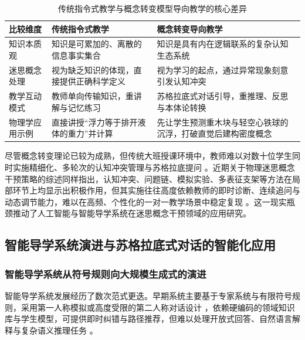 \begin{table}[htbp]
\caption{传统指令式教学与概念转变模型导向教学的核心差异}
\label{tab:1}
\begin{tabularx}{\textwidth}{|X|X|X|}
\hline
比较维度 & 传统指令式教学 & 概念转变导向教学 \\
\hline
知识本质观 & 知识是可累加的、离散的信息事实集合 & 知识是具有内在逻辑联系的复杂认知生态系统 \\
\hline
迷思概念处理 & 视为缺乏知识的体现，直接提供正确科学定义 & 视为学习的起点，通过异常现象刻意引发认知冲突 \citep{ref6} \\
\hline
教学互动模式 & 教师单向传输知识，重讲解与记忆练习 & 苏格拉底式对话引导，重推理、反思与本体论转换 \citep{ref6} \\
\hline
物理学应用示例 & 直接讲授“浮力等于排开液体的重力”并计算 & 先让学生预测重木块与轻空心铁球的沉浮，打破直觉后建构密度概念 \citep{ref1} \\
\hline
\end{tabularx}
\end{table}

尽管概念转变理论已较为成熟，但传统大班授课环境中，教师难以对数十位学生同时实施精细化、多轮次的认知冲突管理与苏格拉底提问 \citep{ref18}。近期关于物理迷思概念干预策略的综述同样指出，认知冲突、问题链、模拟实验、多表征支架等方法在局部环节上均显示出积极作用，但其实施往往高度依赖教师的即时诊断、连续追问与动态调节能力，难以在高频、个性化的一对一教学场景中稳定复现 \citep{majidy2025misconceptions,pratiwi2025conceptualunderstanding}。这一现实瓶颈推动了人工智能与智能导学系统在迷思概念干预领域的应用研究。

\subsection{智能导学系统演进与苏格拉底式对话的智能化应用}

\subsubsection{智能导学系统从符号规则向大规模生成式的演进}

智能导学系统发展经历了数次范式更迭。早期系统主要基于专家系统与有限符号规则，采用第一人称模拟或高度受限的第二人称对话设计 \citep{ref43}，依赖硬编码的领域知识库与学生模型，可提供即时纠错与路径推荐，但难以处理开放式回答、自然语言解释与复杂语义推理任务 \citep{ref44}。

